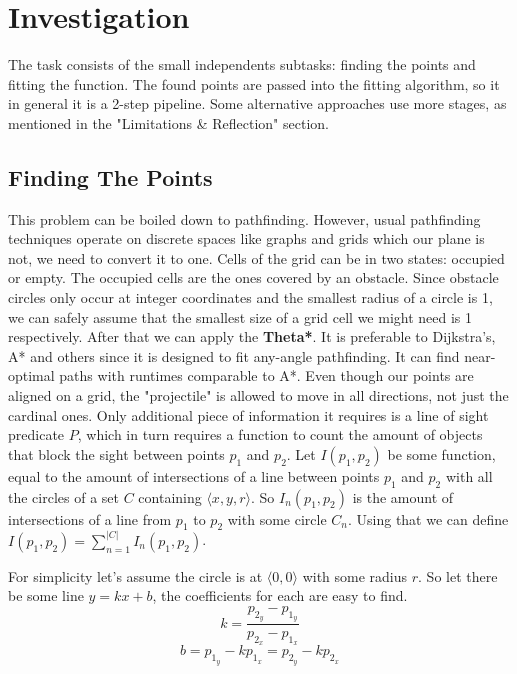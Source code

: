 \documentclass[12pt, titlepage]{article}
\begin{document}
\section{Investigation}
The task consists of the small independents subtasks: finding the points and 
fitting the function. The found points are passed into the fitting algorithm,
so it in general it is a 2-step pipeline. Some alternative approaches use
more stages, as mentioned in the "Limitations \& Reflection" section. 

\subsection{Finding The Points}
This problem can be boiled down to pathfinding. However, usual pathfinding
techniques operate on discrete spaces like graphs and grids which our plane
is not, we need to convert it to one. Cells of the grid can be in two states:
occupied or empty. The occupied cells are the ones covered by an obstacle. 
Since obstacle circles only occur at integer coordinates and the smallest
radius of a circle is 1, we can safely assume that the smallest size of a grid
cell we might need is 1 respectively. After that we can apply the \textbf{Theta*}.
It is preferable to Dijkstra's, A* and others since it is designed to fit
any-angle pathfinding. It can find near-optimal paths with runtimes comparable
to A*. Even though our points are aligned on a grid,
the "projectile" is allowed to move in all directions, not just the cardinal ones. 
Only additional piece of information it requires is a line of sight predicate $P$,
which in turn requires a function to count the amount of objects that block the
sight between points $p_1$ and $p_2$.
Let $I(p_1, p_2)$ be some function, equal to the amount of intersections of a 
line between points $p_1$ and $p_2$  with all the circles of a set $C$ containing 
$\langle x, y, r \rangle$. So $I_n(p_1, p_2)$ is the amount of intersections
of a line from $p_1$ to $p_2$ with some circle $C_n$. 
Using that we can define $I(p_1, p_2) = \sum_{n=1}^{|C|}I_n(p_1, p_2)$.

For simplicity let's assume the circle is at $\langle 0, 0 \rangle$ with
some radius $r$.
So let there be some line $y = kx + b$, the coefficients for each are easy to find.
\begin{equation}
    k = \frac{p_{2_y}-p_{1_y}}{p_{2_x}-p_{1_x}}
\end{equation}
\begin{equation}
    b = p_{1_y} - k p_{1_x} = p_{2_y} - k p_{2_x} 
\end{equation}
\end{document}
